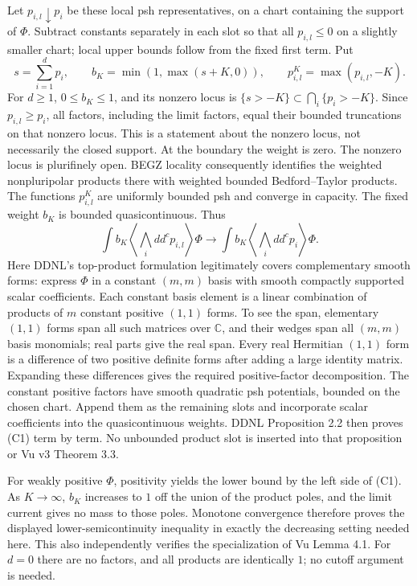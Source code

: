\documentclass[
  11pt,
]{article}
\begin{document}
Let \(p_{i,l}\downarrow p_i\) be these local psh representatives, on a
chart containing the support of \(\Phi\). Subtract constants separately
in each slot so that all \(p_{i,l}\leq0\) on a slightly smaller chart;
local upper bounds follow from the fixed first term. Put \[
s=\sum_{i=1}^d p_i,\qquad b_K=\min(1,\max(s+K,0)),\qquad p^K_{i,l}=\max(p_{i,l},-K).
\] For \(d\geq1\), \(0\leq b_K\leq1\), and its nonzero locus is
\(\{s>-K\}\subset\bigcap_i\{p_i>-K\}\). Since \(p_{i,l}\geq p_i\), all
factors, including the limit factors, equal their bounded truncations on
that nonzero locus. This is a statement about the nonzero locus, not
necessarily the closed support. At the boundary the weight is zero. The
nonzero locus is plurifinely open. BEGZ locality consequently identifies
the weighted nonpluripolar products there with weighted bounded
Bedford--Taylor products. The functions \(p^K_{i,l}\) are uniformly
bounded psh and converge in capacity. The fixed weight \(b_K\) is
bounded quasicontinuous. Thus \[
\int b_K\left\langle\bigwedge_i dd^cp_{i,l}\right\rangle\Phi
\longrightarrow
\int b_K\left\langle\bigwedge_i dd^cp_i\right\rangle\Phi. \tag{C1}
\] Here DDNL's top-product formulation legitimately covers complementary
smooth forms: express \(\Phi\) in a constant \((m,m)\) basis with smooth
compactly supported scalar coefficients. Each constant basis element is
a linear combination of products of \(m\) constant positive \((1,1)\)
forms. To see the span, elementary \((1,1)\) forms span all such
matrices over \(\mathbb{C}\), and their wedges span all \((m,m)\) basis
monomials; real parts give the real span. Every real Hermitian \((1,1)\)
form is a difference of two positive definite forms after adding a large
identity matrix. Expanding these differences gives the required
positive-factor decomposition. The constant positive factors have smooth
quadratic psh potentials, bounded on the chosen chart. Append them as
the remaining slots and incorporate scalar coefficients into the
quasicontinuous weights. DDNL Proposition 2.2 then proves (C1) term by
term. No unbounded product slot is inserted into that proposition or Vu
v3 Theorem 3.3.

For weakly positive \(\Phi\), positivity yields the lower bound by the
left side of (C1). As \(K\to\infty\), \(b_K\) increases to \(1\) off the
union of the product poles, and the limit current gives no mass to those
poles. Monotone convergence therefore proves the displayed
lower-semicontinuity inequality in exactly the decreasing setting needed
here. This also independently verifies the specialization of Vu Lemma
4.1. For \(d=0\) there are no factors, and all products are identically
\(1\); no cutoff argument is needed.
\end{document}
